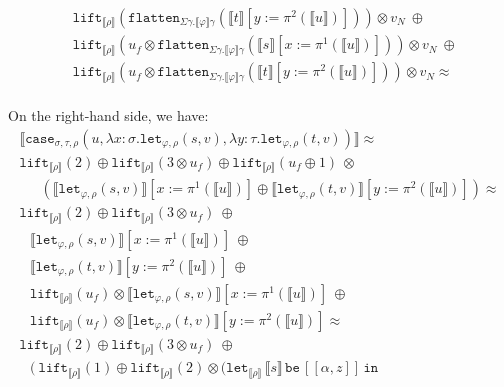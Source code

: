 \documentclass[a4paper,UKenglish,cleveref,autoref,numberwithinsect]{lipics-v2019}
\theoremstyle{definition}
\newcommand{\abs}[2]{\lambda #1.#2}
\newcommand{\expair}[2]{[#1,#2]}
\newcommand{\flatten}{\mathtt{flatten}}
\newcommand{\lift}{\mathtt{lift}}
\newcommand{\typeinterpret}[1]{\llbracket #1 \rrbracket}
\newcommand{\interpret}[1]{\llbracket #1 \rrbracket}
\newcommand{\xlet}[4]{\mathtt{let}_{#1}\,#2\,\mathtt{be}\,[#3]\,\mathtt{in}\,#4}
\begin{document}
\begin{itemize}
\[\begin{array}{l}
  \phantom{A}
  \lift_{\typeinterpret{\rho}}(\flatten_{\Sigma\gamma.\typeinterpret{
    \varphi}\gamma}(\interpret{t}[y:=\pi^2(\interpret{u})]))
    \otimes v_N\ \oplus \\
  \phantom{A}
  \lift_{\typeinterpret{\rho}}(u_f \otimes
    \flatten_{\Sigma\gamma.\typeinterpret{\varphi}\gamma}(
    \interpret{s}[x:=\pi^1(\interpret{u})]))
    \otimes v_N\ \oplus \\
  \phantom{A} \lift_{\typeinterpret{\rho}}(u_f \otimes
    \flatten_{\Sigma\gamma.\typeinterpret{
    \varphi}\gamma}(\interpret{t}[y:=\pi^2(\interpret{u})])) \otimes
    v_N \approx \\
  \end{array}
  \]

  On the right-hand side, we have:
  \[
  \begin{array}{l}
  \interpret{\mathtt{case}_{\sigma,\tau,\rho}(u,
  \abs{x:\sigma}{\mathtt{let}_{\varphi,\rho}(s,v)},
  \abs{y:\tau}{\mathtt{let}_{\varphi,\rho}(t,v)})} \approx \\
  \lift_{\typeinterpret{\rho}}(2) \oplus
  \lift_{\typeinterpret{\rho}}(3 \otimes u_f) \oplus
  \lift_{\typeinterpret{\rho}}(u_f \oplus 1)\ \otimes \\
  \phantom{AB}
    (\interpret{\mathtt{let}_{\varphi,\rho}(s,v)}[x:=\pi^1(
    \interpret{u})] \oplus
    \interpret{\mathtt{let}_{\varphi,\rho}(t,v)}[y:=\pi^2(
    \interpret{u})]) \approx \\
  \lift_{\typeinterpret{\rho}}(2) \oplus
  \lift_{\typeinterpret{\rho}}(3 \otimes u_f)\ \oplus \\
  \phantom{A}
  \interpret{\mathtt{let}_{\varphi,\rho}(s,v)}[x:=\pi^1(
    \interpret{u})]\ \oplus \\
  \phantom{A}
    \interpret{\mathtt{let}_{\varphi,\rho}(t,v)}[y:=\pi^2(
    \interpret{u})]\ \oplus \\
  \phantom{A}
  \lift_{\typeinterpret{\rho}}(u_f) \otimes
    \interpret{\mathtt{let}_{\varphi,\rho}(s,v)}[x:=\pi^1(
    \interpret{u})]\ \oplus \\
  \phantom{A}
  \lift_{\typeinterpret{\rho}}(u_f) \otimes
    \interpret{\mathtt{let}_{\varphi,\rho}(t,v)}[y:=\pi^2(
    \interpret{u})] \approx \\
  \lift_{\typeinterpret{\rho}}(2) \oplus
  \lift_{\typeinterpret{\rho}}(3 \otimes u_f)\ \oplus \\
  \phantom{A}
  (\ \lift_{\typeinterpret{\rho}}(1) \oplus
    \lift_{\typeinterpret{\rho}}(2) \otimes
    (\xlet{\typeinterpret{\rho}}{\interpret{s}}{\expair{\alpha}{z}}{
}
\end{array}\]
\end{itemize}
\end{document}
